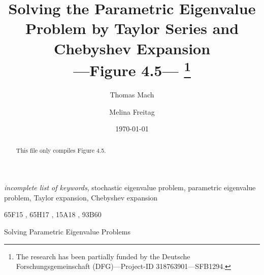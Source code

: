 \documentclass[final]{siamltex}
\title{Solving the Parametric Eigenvalue Problem by Taylor Series and Chebyshev
  Expansion\\---Figure 4.5---%
  \thanks{The research has been partially funded by the Deutsche
Forschungsgemeinschaft (DFG)---Project-ID 318763901---SFB1294.}
}
\author{Thomas Mach\footnotemark[3]\and Melina Freitag\footnotemark[3]}
\begin{document}
\maketitle

\renewcommand{\thefootnote}{\fnsymbol{footnote}}

%



\renewcommand{\thefootnote}{\arabic{footnote}}


\date{\today}
\maketitle

\begin{abstract}
  This file only compiles Figure 4.5.
\end{abstract}

\begin{keywords}
\textit{incomplete list of keywords}, %
stochastic eigenvalue problem, %
parametric eigenvalue problem, %
Taylor expansion, %
Chebyshev expansion
\end{keywords}

\begin{AMS}
  65F15%
  , 65H17%
  , 15A18%
  , 93B60%
\end{AMS}

\pagestyle{myheadings} %
\thispagestyle{plain} %
\markboth{%
}%
{Solving Parametric Eigenvalue Problems}



\end{document}
